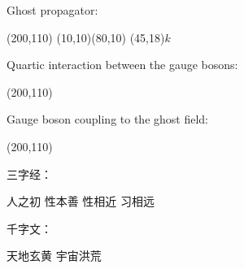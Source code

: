 \documentclass{article}
\begin{document}
Ghost propagator:

\begin{center}
    \begin{axopicture}(200,110)
    (10,10)(80,10)
    \Text(45,18){$k$}
    \end{axopicture}
\end{center}

Quartic interaction between the gauge bosons:

\begin{center}
    \begin{axopicture}(200,110)
    \end{axopicture}
\end{center}

Gauge boson coupling to the ghost field:

\begin{center}
    \begin{axopicture}(200,110)
    \end{axopicture}
\end{center}

三字经：\parbox[t]{3em}%
{人之初 性本善 性相近 习相远}
\quad
千字文：
\begin{minipage}[b][8ex][t]{4em}
天地玄黄 宇宙洪荒
\end{minipage}
\end{document}
